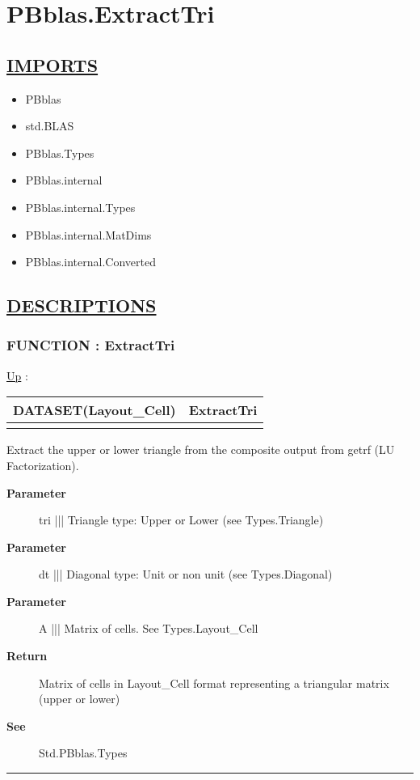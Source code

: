\chapter*{PBblas.ExtractTri}
\hypertarget{ecldoc:toc:PBblas.ExtractTri}{}

\section*{\underline{IMPORTS}}
\begin{itemize}
\item PBblas
\item std.BLAS
\item PBblas.Types
\item PBblas.internal
\item PBblas.internal.Types
\item PBblas.internal.MatDims
\item PBblas.internal.Converted
\end{itemize}

\section*{\underline{DESCRIPTIONS}}
\subsection*{FUNCTION : ExtractTri}
\hypertarget{ecldoc:pbblas.extracttri}{}
\hyperlink{ecldoc:toc:PBblas}{Up} :

{\renewcommand{\arraystretch}{1.5}
\begin{tabularx}{\textwidth}{|>{\raggedright\arraybackslash}l|X|}
\hline
\hspace{0pt}DATASET(Layout\_Cell) & ExtractTri \\
\hline
\multicolumn{2}{|>{\raggedright\arraybackslash}X|}{\hspace{0pt}(Triangle tri, Diagonal dt, DATASET(Layout\_Cell) A)} \\
\hline
\end{tabularx}
}

\par
Extract the upper or lower triangle from the composite output from getrf (LU Factorization).

\par
\begin{description}
\item [\textbf{Parameter}] tri ||| Triangle type: Upper or Lower (see Types.Triangle)
\item [\textbf{Parameter}] dt ||| Diagonal type: Unit or non unit (see Types.Diagonal)
\item [\textbf{Parameter}] A ||| Matrix of cells. See Types.Layout\_Cell
\item [\textbf{Return}] Matrix of cells in Layout\_Cell format representing a triangular matrix (upper or lower)
\item [\textbf{See}] Std.PBblas.Types
\end{description}

\rule{\linewidth}{0.5pt}
